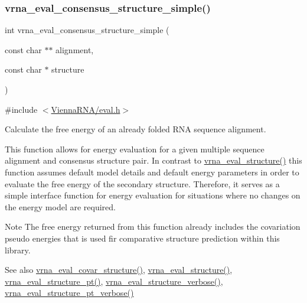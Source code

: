 \subsubsection{\texorpdfstring{vrna\_eval\_consensus\_structure\_simple()}{vrna\_eval\_consensus\_structure\_simple()}}
{\footnotesize\ttfamily int vrna\+\_\+eval\+\_\+consensus\+\_\+structure\+\_\+simple (\begin{DoxyParamCaption}\item[{const char $\ast$$\ast$}]{alignment,  }\item[{const char $\ast$}]{structure }\end{DoxyParamCaption})}



{\ttfamily \#include $<$\mbox{\hyperlink{eval_8h}{Vienna\+R\+N\+A/eval.\+h}}$>$}



Calculate the free energy of an already folded R\+NA sequence alignment. 

This function allows for energy evaluation for a given multiple sequence alignment and consensus structure pair. In contrast to \mbox{\hyperlink{group__eval_ga58f199f1438d794a265f3b27fc8ea631}{vrna\+\_\+eval\+\_\+structure()}} this function assumes default model details and default energy parameters in order to evaluate the free energy of the secondary structure. Therefore, it serves as a simple interface function for energy evaluation for situations where no changes on the energy model are required.

\begin{DoxyNote}{Note}
The free energy returned from this function already includes the covariation pseudo energies that is used fir comparative structure prediction within this library.
\end{DoxyNote}
\begin{DoxySeeAlso}{See also}
\mbox{\hyperlink{group__eval_ga6cea75c0eb9857fb59172be54cab09e0}{vrna\+\_\+eval\+\_\+covar\+\_\+structure()}}, \mbox{\hyperlink{group__eval_ga58f199f1438d794a265f3b27fc8ea631}{vrna\+\_\+eval\+\_\+structure()}}, \mbox{\hyperlink{group__eval_gadbd09372ddfd7a450bbd590c96a6bfe4}{vrna\+\_\+eval\+\_\+structure\+\_\+pt()}}, \mbox{\hyperlink{group__eval_ga0928d699d310178f84ee2351034e5cb5}{vrna\+\_\+eval\+\_\+structure\+\_\+verbose()}}, \mbox{\hyperlink{group__eval_ga8a517cfeeae8c376ae7b1e0c401d38b4}{vrna\+\_\+eval\+\_\+structure\+\_\+pt\+\_\+verbose()}}
\end{DoxySeeAlso}

